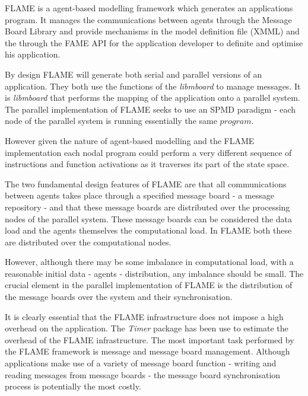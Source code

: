 \label{sec:performance-flame}
FLAME is a agent-based modelling framework which generates an applications program. It manages the communications between agents through the Message Board Library and provide mechanisms in the model definition file (XMML) and the through the FAME API for the application developer to definite and optimise his application.

By design FLAME will generate both serial and parallel versions of an application. They both use the functions of the \textit{libmboard} to manage messages. It is \textit{libmboard} that performs the mapping of the application onto a parallel system. The parallel implementation of FLAME seeks to use an SPMD paradigm - each node of the parallel system is running essentially the same $program$. 

However given the nature of agent-based modelling and the FLAME implementation each nodal program could perform a very different sequence of instructions and function activations as it traverses its part of the state space. 

The two fundamental design features of FLAME are that all communications between agents takes place through a specified message board - a message repository - and that these message boards are distributed over the processing nodes of the parallel system. These message boards can be considered the data load and the agents themselves the computational load. In FLAME both these are distributed over the computational nodes.

However, although there may be some imbalance in computational load, with a reasonable initial data - agents - distribution, any imbalance should be small. The crucial element in the parallel implementation of FLAME is the distribution of the message boards over the system and their synchronisation.

It is clearly essential that the FLAME infrastructure does not impose a high overhead on the application. The \textit{Timer} package has been use to estimate the overhead of the FLAME infrastructure. The most important task performed by the FLAME framework is message and  message board management. Although applications make use of a variety of message board function - writing and reading messages from message boards - the message board synchronisation process is potentially the most costly.

